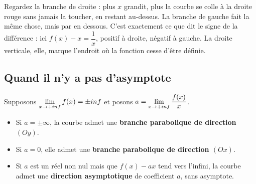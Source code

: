 \begin{visualisation}
\begin{center}
\end{center}

Regardez la branche de droite : plus $x$ grandit, plus la courbe se colle à la
droite rouge sans jamais la toucher, en restant au-dessus. La branche de
gauche fait la même chose, mais par en dessous. C'est exactement ce que dit le
signe de la différence : ici $f(x)-x = \dfrac{1}{x}$, positif à droite,
négatif à gauche. La droite verticale, elle, marque l'endroit où la fonction
cesse d'être définie.
\end{visualisation}

\subsection{Quand il n'y a pas d'asymptote}

\begin{definition}
Supposons $\limpinf f(x) = \pm\infty$ et posons $a = \limpinf \dfrac{f(x)}{x}$.
\begin{itemize}[leftmargin=1.4em, itemsep=0.2em]
  \item Si $a = \pm\infty$, la courbe admet une \textbf{branche parabolique de
        direction $(Oy)$}.
  \item Si $a = 0$, elle admet une \textbf{branche parabolique de direction
        $(Ox)$}.
  \item Si $a$ est un réel non nul mais que $f(x)-ax$ tend vers l'infini, la
        courbe admet une \textbf{direction asymptotique} de coefficient $a$,
        sans asymptote.
\end{itemize}
\end{definition}

